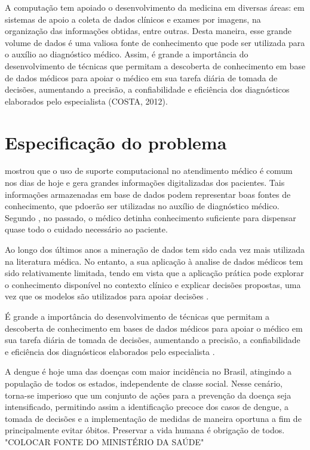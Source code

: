 \documentclass[
	12pt,				%
	openright,			%
	oneside,	
	a4paper,				%
	english,				%
	brazil				%
]{abntex2/abntex2} %
\begin{document}
	A computação tem apoiado o desenvolvimento da medicina em diversas áreas: em sistemas de apoio a coleta de dados clínicos e exames por imagens, na organização das informações obtidas, entre outras. Desta maneira, esse grande volume de dados é uma valiosa fonte de conhecimento que pode ser utilizada para o auxílio ao diagnóstico médico. Assim, é grande a importância do desenvolvimento de técnicas que permitam a descoberta de conhecimento em base de dados médicos para apoiar o médico em sua tarefa diária de tomada de decisões, aumentando a precisão, a confiabilidade e eficiência dos diagnósticos elaborados pelo especialista (COSTA, 2012).

	\section{Especificação do problema}
	
		\cite{costa:2012} mostrou que o uso de suporte computacional no atendimento médico é comum nos dias de hoje e gera grandes informações digitalizadas dos pacientes. Tais informações armazenadas em base de dados podem representar boas fontes de conhecimento, que pdoerão ser utilizadas no auxílio de diagnóstico médico. Segundo \cite{bezerra:2009}, no passado, o médico detinha conhecimento suficiente para dispensar quase todo o cuidado necessário ao paciente.
		
		Ao longo dos últimos anos a mineração de dados tem sido cada vez mais utilizada na literatura médica. No entanto, a sua aplicação à analise de dados médicos tem sido relativamente limitada, tendo em vista que a aplicação prática pode explorar o conhecimento disponível no contexto clínico e explicar decisões propostas, uma vez que os modelos são utilizados para apoiar decisões \cite{bellazzi:2008}.
		
		É grande a importância do desenvolvimento de técnicas que permitam a descoberta de conhecimento em bases de dados médicos para apoiar o médico em sua tarefa diária de tomada de decisões, aumentando a precisão, a confiabilidade e eficiência dos diagnósticos elaborados pelo especialista \cite{costa:2012}.
		
		A dengue é hoje uma das doenças com maior incidência no Brasil, atingindo a população de todos os estados, independente de classe social. Nesse cenário, torna-se imperioso que um conjunto de ações para a prevenção da doença seja intensificado, permitindo assim a identificação precoce dos casos de dengue, a tomada de decisões e a implementação de medidas de maneira oportuna a fim de principalmente evitar óbitos. Preservar a vida humana é obrigação de todos. "COLOCAR FONTE DO MINISTÉRIO DA SAÚDE"
\end{document}
